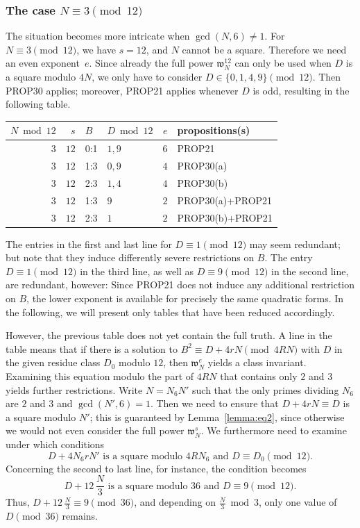 \documentclass[12pt,twoside,leqno]{article}
\numberwithin{equation}{section}
\newcommand{\w}{\mathfrak w}
\begin{document}
\subsubsection{The case \texorpdfstring {$N\equiv 3\pmod {12}$}{N=3 mod 12}}

The situation becomes more intricate when $\gcd (N, 6) \neq 1$.
For $N \equiv 3 \pmod {12}$, we have $s=12$, and $N$ cannot be a square.
Therefore we need an even exponent~$e$.
Since already the full power $\w_N^{12}$ can only be used when
$D$ is a square modulo $4N$, we only have to consider
$D \in \{ 0, 1, 4, 9 \} \pmod {12}$. Then PROP30 applies; moreover,
PROP21 applies whenever $D$ is odd, resulting in the following table.

\begin{center}
\begin{tabular}{|r|r||l|l||r||l|}\hline
$N\bmod {12}$ &  $s$ & $B$ & $D \bmod 12$ & $e$ & propositions(s)  \\
\hline
$3$           & $12$ & 0:1 & $1, 9$       & $6$ & PROP21           \\
$3$           & $12$ & 1:3 & $0, 9$       & $4$ & PROP30(a)        \\
$3$           & $12$ & 2:3 & $1, 4$       & $4$ & PROP30(b)        \\
$3$           & $12$ & 1:3 & $9$          & $2$ & PROP30(a)+PROP21 \\
$3$           & $12$ & 2:3 & $1$          & $2$ & PROP30(b)+PROP21 \\
\hline
\end{tabular}
\end{center}

The entries in the first and last line for $D \equiv 1 \pmod {12}$
may seem redundant; but note that they induce differently severe
restrictions on $B$. The entry $D \equiv 1 \pmod {12}$ in the third
line, as well as $D \equiv 9 \pmod {12}$ in the second line, are
redundant, however: Since PROP21 does not induce any additional
restriction on $B$, the lower exponent is available for precisely
the same quadratic forms. In the following, we will present only
tables that have been reduced accordingly.

However, the previous table does not yet contain the full truth.
A line in the table means that if there is a solution to
$B^2 \equiv D + 4rN \pmod {4RN}$ with $D$ in the given residue
class $D_0$ modulo $12$, then $\w_N^e$ yields a class invariant.
Examining this equation modulo the part of $4 R N$ that contains
only $2$ and $3$ yields further restrictions. Write $N = N_6 N'$
such that the only primes dividing $N_6$ are $2$ and $3$ and
$\gcd (N', 6) = 1$. Then we need to ensure that $D + 4 r N \equiv D$
is a square modulo $N'$; this is guaranteed by Lemma~\ref {lemma:eq2},
since otherwise we would not even consider the full power $\w_N^s$.
We furthermore need to examine under which conditions
\[
D + 4 N_6 r N' \text { is a square modulo $4 R N_6$ and }
D \equiv D_0 \pmod {12}.
\]
Concerning the second to last line, for instance, the condition
becomes
\[
D + 12 \, \frac {N}{3}  \text { is a square modulo $36$ and }
D \equiv 9 \pmod {12}.
\]
Thus,
$D + 12 \, \frac {N}{3} \equiv 9 \pmod {36}$, and
depending on $\frac {N}{3} \bmod 3$, only one value of
$D \pmod {36}$ remains.
\end{document}
